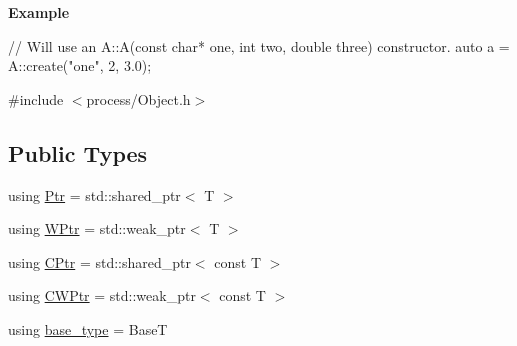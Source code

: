 {\bfseries Example} 
\begin{DoxyCode}
\textcolor{comment}{// Will use an A::A(const char* one, int two, double three) constructor.}
\textcolor{keyword}{auto} a = A::create(\textcolor{stringliteral}{"one"}, 2, 3.0);
\end{DoxyCode}
 

{\ttfamily \#include $<$process/\+Object.\+h$>$}

\subsection*{Public Types}
\begin{DoxyCompactItemize}
\item 
using \hyperlink{classdg_1_1deepcore_1_1_object_t_ab54805874b0d6881bc1d1a2ced7d49bf}{Ptr} = std\+::shared\+\_\+ptr$<$ T $>$
\item 
using \hyperlink{classdg_1_1deepcore_1_1_object_t_a7cf2958227ec5d42c71a74562af4e3b8}{W\+Ptr} = std\+::weak\+\_\+ptr$<$ T $>$
\item 
using \hyperlink{classdg_1_1deepcore_1_1_object_t_a91edf1cc372d9a68025bed01f08d3a38}{C\+Ptr} = std\+::shared\+\_\+ptr$<$ const T $>$
\item 
using \hyperlink{classdg_1_1deepcore_1_1_object_t_a03f850606335b509cb5bcb296ac18b62}{C\+W\+Ptr} = std\+::weak\+\_\+ptr$<$ const T $>$
\item 
using \hyperlink{classdg_1_1deepcore_1_1_object_t_af62877471d4b1dc37f23b457fe406814}{base\+\_\+type} = BaseT
\end{DoxyCompactItemize}
